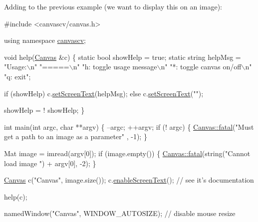 Adding to the previous example (we want to display this on an image)\+: 
\begin{DoxyCode}
\textcolor{preprocessor}{#include <canvascv/canvas.h>}

\textcolor{keyword}{using namespace }\hyperlink{namespacecanvascv}{canvascv};

\textcolor{keywordtype}{void} help(\hyperlink{classcanvascv_1_1Canvas}{Canvas} &c)
\{
    \textcolor{keyword}{static} \textcolor{keywordtype}{bool} showHelp = \textcolor{keyword}{true};
    \textcolor{keyword}{static} \textcolor{keywordtype}{string} helpMsg =
            \textcolor{stringliteral}{"Usage:\(\backslash\)n"}
            \textcolor{stringliteral}{"=====\(\backslash\)n"}
            \textcolor{stringliteral}{"h: toggle usage message\(\backslash\)n"}
            \textcolor{stringliteral}{"*: toggle canvas on/off\(\backslash\)n"}
            \textcolor{stringliteral}{"q: exit"};


    \textcolor{keywordflow}{if} (showHelp) c.\hyperlink{classcanvascv_1_1Canvas_aaedea276b82a8a4cfc0895ae81113cfd}{setScreenText}(helpMsg);
    \textcolor{keywordflow}{else} c.\hyperlink{classcanvascv_1_1Canvas_aaedea276b82a8a4cfc0895ae81113cfd}{setScreenText}(\textcolor{stringliteral}{""});

    showHelp = ! showHelp;
\}

\textcolor{keywordtype}{int} main(\textcolor{keywordtype}{int} argc, \textcolor{keywordtype}{char} **argv)
\{
    --argc;
    ++argv;
    \textcolor{keywordflow}{if} (! argc)
    \{
        \hyperlink{classcanvascv_1_1Canvas_add93c0d5cc1e9b49f97510952a8a1961}{Canvas::fatal}(\textcolor{stringliteral}{"Must get a path to an image as a parameter"} , -1);
    \}

    Mat image = imread(argv[0]);
    \textcolor{keywordflow}{if} (image.empty())
    \{
        \hyperlink{classcanvascv_1_1Canvas_add93c0d5cc1e9b49f97510952a8a1961}{Canvas::fatal}(\textcolor{keywordtype}{string}(\textcolor{stringliteral}{"Cannot load image "}) + argv[0], -2);
    \}

    \hyperlink{classcanvascv_1_1Canvas}{Canvas} c(\textcolor{stringliteral}{"Canvas"}, image.size());
    c.\hyperlink{classcanvascv_1_1Canvas_ae68d3277e738d349232400b38f0e5f9e}{enableScreenText}(); \textcolor{comment}{// see it's documentation}

    help(c);

    namedWindow(\textcolor{stringliteral}{"Canvas"}, WINDOW\_AUTOSIZE); \textcolor{comment}{// disable mouse resize}


\end{DoxyCode}
